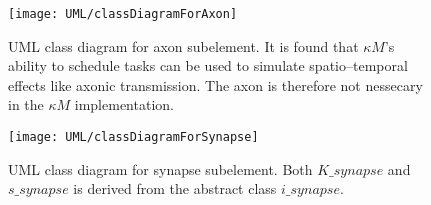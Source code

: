 		\begin{figure}[hbt!p]
			\centerline{ \texttt{[image: UML/classDiagramForAxon]} }
			\caption[UML class diagram for axon subelement]{
						UML class diagram for axon subelement.
						It is found that $\kappa M$'s ability to schedule tasks can be used to simulate spatio--temporal effects like axonic transmission.
						The axon is therefore not nessecary in the $\kappa M$ implementation.
					}
		\end{figure}

		\begin{figure}[hbt!p]
			\centerline{ \texttt{[image: UML/classDiagramForSynapse]} }
			\caption[UML class diagram for synapse subelement]{
				UML class diagram for synapse subelement. 
				Both $K\_synapse$ and $s\_synapse$ is derived from the abstract class $i\_synapse$.
			}
		\end{figure}
\newpage
	
